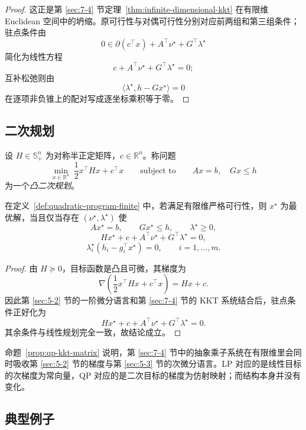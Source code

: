 \begin{proof}
这正是第 \ref{sec:7-4} 节定理~\ref{thm:infinite-dimensional-kkt} 在有限维 Euclidean 空间中的坍缩。原可行性与对偶可行性分别对应前两组和第三组条件；驻点条件由
\[
0\in \partial(c^\top x)+A^\top \nu^\star+G^\top \lambda^\star
\]
简化为线性方程
\[
c+A^\top \nu^\star+G^\top \lambda^\star=0;
\]
互补松弛则由
\[
\langle \lambda^\star,h-Gx^\star\rangle=0
\]
在逐项非负锥上的配对写成逐坐标乘积等于零。
\end{proof}

\subsection{二次规划}

\begin{definition}[有限维二次规划]\label{def:quadratic-program-finite}
设 $H\in \mathbb S^n_+$ 为对称半正定矩阵，$c\in \mathbb R^n$。称问题
\[
\min_{x\in \mathbb R^n}\ \frac12 x^\top Hx+c^\top x
\qquad \text{subject to}\qquad
Ax=b,\quad Gx\le h
\]
为一个\emph{凸二次规划}。
\end{definition}

\begin{proposition}\label{prop:qp-kkt-matrix}
在定义~\ref{def:quadratic-program-finite} 中，若满足有限维严格可行性，则 $x^\star$ 为最优解，当且仅当存在 $(\nu^\star,\lambda^\star)$ 使
\[
Ax^\star=b,\qquad Gx^\star\le h,\qquad \lambda^\star\ge 0,
\]
\[
Hx^\star+c+A^\top \nu^\star+G^\top \lambda^\star=0,
\]
\[
\lambda_i^\star(h_i-g_i^\top x^\star)=0,\qquad i=1,\dots,m.
\]
\end{proposition}

\begin{proof}
由 $H\succeq 0$，目标函数是凸且可微，其梯度为
\[
\nabla\!\left(\frac12 x^\top Hx+c^\top x\right)=Hx+c.
\]
因此第 \ref{sec:5-2} 节的一阶微分语言和第 \ref{sec:7-4} 节的 KKT 系统结合后，驻点条件正好化为
\[
Hx^\star+c+A^\top \nu^\star+G^\top \lambda^\star=0.
\]
其余条件与线性规划完全一致，故结论成立。
\end{proof}

\begin{remark}
命题~\ref{prop:qp-kkt-matrix} 说明，第 \ref{sec:7-4} 节中的抽象乘子系统在有限维里会同时吸收第 \ref{sec:5-2} 节的梯度与第 \ref{sec:5-3} 节的次微分语言。LP 对应的是线性目标的次梯度为常向量，QP 对应的是二次目标的梯度为仿射映射；而结构本身并没有变化。
\end{remark}

\subsection{典型例子}

